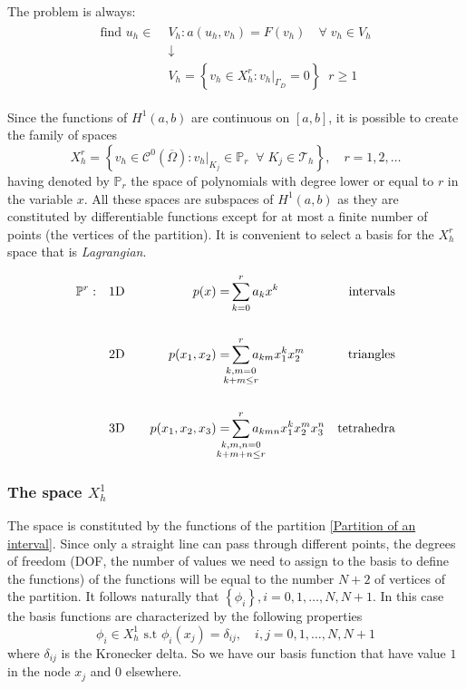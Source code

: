 The problem is always: 
\begin{align}
    \begin{split} 
        \text{find } u_h \in \;&V_h : a(u_h, v_h) = F(v_h) \quad \forall \; v_h \in V_h \\
        &\downarrow\\
        &V_h = \left\lbrace v_h \in X^r_h : v_h\vert_{\Gamma_D} = 0\right\rbrace \; \; r \geq 1 \label{Galerkin weak formulation}
    \end{split}   
\end{align}

Since the functions of \(H^1(a,b)\) are continuous on \([a,b]\), it is possible to create the family of spaces 
\begin{equation}
    X_h^r = \left\{v_h \in \mathcal{C}^0\left(\overline{\Omega}\right) : v_h \vert_{K_j} \in \mathbb{P}_r \;\; \forall \; K_j \in \mathcal{T}_h\right\}, \quad r= 1,2,\ldots \label{Family of spaces FEM}
\end{equation}
having denoted by \(\mathbb{P}_r\) the space of polynomials with degree lower or equal to \(r\) in the variable \(x\). All these spaces are subspaces of \(H^1(a,b)\) as they are constituted by differentiable functions except for at most a finite number of points (the vertices of the partition). It is convenient to select a basis for the \(X^r_h\) space that is \textit{Lagrangian}.

    \begin{align*}
        \mathbb{P}^r:\quad &\text{1D} \quad &p(x) =& \sum_{k=0}^r a_k x^k &\text{intervals} \\
        \\
                      &\text{2D}  \quad &p(x_1, x_2) =& \sum_{\mathclap{\substack{k,m=0 \\ k + m \leq r}}}^r a_{km} x_1^k x_2^m  &\text{triangles} \\
         \\
                      &\text{3D} \quad &p(x_1, x_2, x_3) =& \sum_{\mathclap{\substack{k,m,n=0 \\ k + m + n  \leq r}}}^r a_{kmn} x_1^k x_2^m x_3^n &\text{tetrahedra}
    \end{align*}

\subsubsection*{The space \(X^1_h\)}
The space is constituted by the functions of the partition \eqref{Partition of an interval}. Since only a straight line can pass through different points, the degrees of freedom (DOF, the number of values we need to assign to the basis to define the functions)  of the functions will be equal to the number \(N+2\) of vertices of the partition. It follows naturally that \(\left\lbrace\phi_i\right\rbrace, i = 0, 1, \ldots, N, N+1\).
In this case the basis functions are characterized by the following properties 
\[
    \phi_i \in X^1_h \text{ s.t } \phi_i(x_j) = \delta_{ij}, \quad i, j = 0, 1, \ldots, N, N+1
\]
where \(\delta_{ij}\) is the Kronecker delta. So we have our basis function that have value \(1\) in the node \(x_j\) and \(0\) elsewhere.


